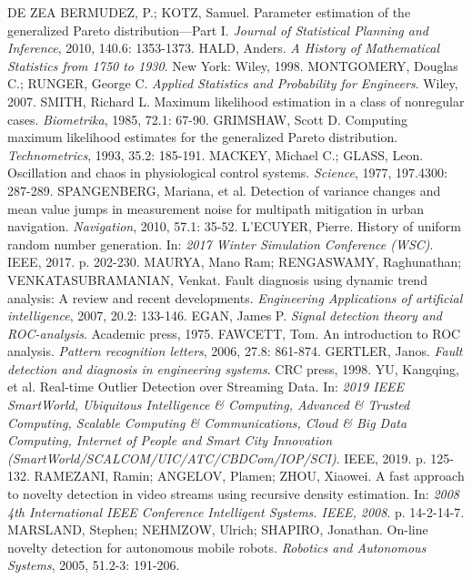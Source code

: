 \documentclass[11pt,twoside,openright]{report}
\begin{document}
\begin{thebibliography}{L}
DE ZEA BERMUDEZ, P.; KOTZ, Samuel. Parameter estimation of the generalized Pareto distribution—Part I. \textit{Journal of Statistical Planning and Inference}, 2010, 140.6: 1353-1373.
HALD, Anders. \textit{A History of Mathematical Statistics from 1750 to 1930}. New York: Wiley, 1998.
MONTGOMERY, Douglas C.; RUNGER, George C. \textit{Applied Statistics and Probability for Engineers}. Wiley, 2007.
SMITH, Richard L. Maximum likelihood estimation in a class of nonregular cases. \textit{Biometrika}, 1985, 72.1: 67-90.
GRIMSHAW, Scott D. Computing maximum likelihood estimates for the generalized Pareto distribution. \textit{Technometrics}, 1993, 35.2: 185-191.
MACKEY, Michael C.; GLASS, Leon. Oscillation and chaos in physiological control systems. \textit{Science}, 1977, 197.4300: 287-289.
SPANGENBERG, Mariana, et al. Detection of variance changes and mean value jumps in measurement noise for multipath mitigation in urban navigation. \textit{Navigation}, 2010, 57.1: 35-52.
L'ECUYER, Pierre. History of uniform random number generation. In: \textit{2017 Winter Simulation Conference (WSC)}. IEEE, 2017. p. 202-230.
MAURYA, Mano Ram; RENGASWAMY, Raghunathan; VENKATASUBRAMANIAN, Venkat. Fault diagnosis using dynamic trend analysis: A review and recent developments. \textit{Engineering Applications of artificial intelligence}, 2007, 20.2: 133-146.
EGAN, James P. \textit{Signal detection theory and ROC-analysis}. Academic press, 1975.
FAWCETT, Tom. An introduction to ROC analysis. \textit{Pattern recognition letters}, 2006, 27.8: 861-874.
GERTLER, Janos. \textit{Fault detection and diagnosis in engineering systems}. CRC press, 1998.
YU, Kangqing, et al. Real-time Outlier Detection over Streaming Data. In: \textit{2019 IEEE SmartWorld, Ubiquitous Intelligence \& Computing, Advanced \& Trusted Computing, Scalable Computing \& Communications, Cloud \& Big Data Computing, Internet of People and Smart City Innovation (SmartWorld/SCALCOM/UIC/ATC/CBDCom/IOP/SCI)}. IEEE, 2019. p. 125-132.
RAMEZANI, Ramin; ANGELOV, Plamen; ZHOU, Xiaowei. A fast approach to novelty detection in video streams using recursive density estimation. In: \textit{2008 4th International IEEE Conference Intelligent Systems. IEEE, 2008}. p. 14-2-14-7.
MARSLAND, Stephen; NEHMZOW, Ulrich; SHAPIRO, Jonathan. On-line novelty detection for autonomous mobile robots. \textit{Robotics and Autonomous Systems}, 2005, 51.2-3: 191-206.

\end{thebibliography}
\end{document}
